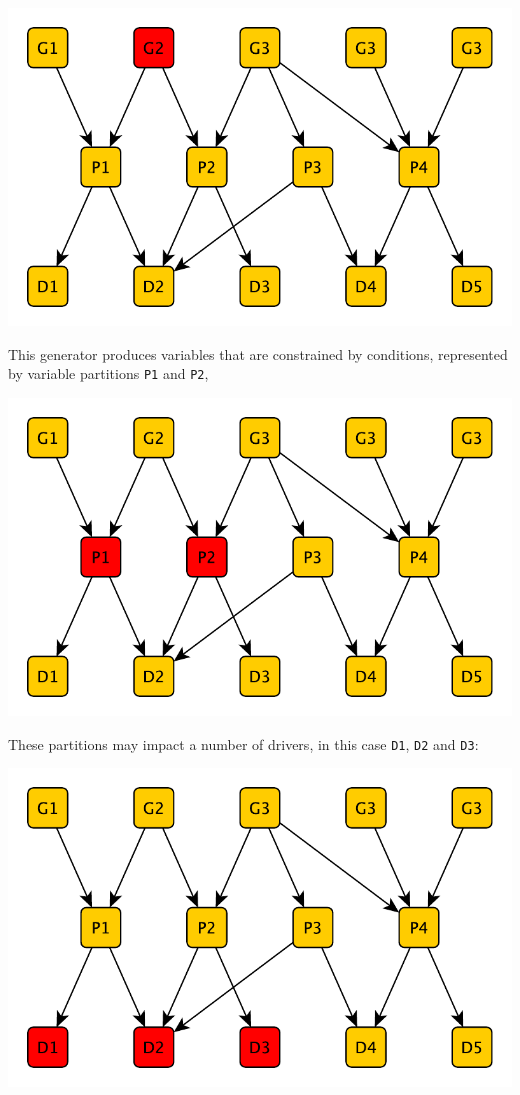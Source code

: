 \documentclass[a4paper]{article}
\def\P#1{\texttt{P#1}\xspace}
\def\D#1{\texttt{D#1}\xspace}
\begin{document}
\centerline{\includegraphics[scale=0.5]{img/network1-generate.pdf}}

This generator produces variables that are constrained by conditions, represented by variable partitions \P1 and \P2,

\centerline{\includegraphics[scale=0.5]{img/network2-varparts.pdf}}

These partitions may impact a number of drivers, in this case \D1, \D2 and \D3:

\centerline{\includegraphics[scale=0.5]{img/network3-drivers.pdf}}
\end{document}
